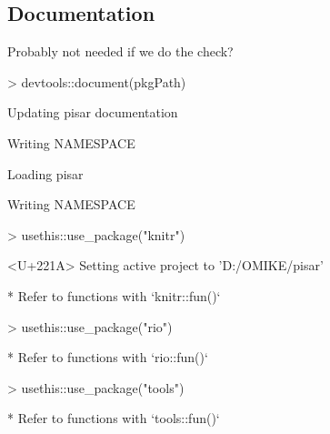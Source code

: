 \documentclass[a4paper,12pt]{article}\usepackage[]{graphicx}\usepackage[]{color}
\begin{document}
\clearpage
\subsection{Documentation}
Probably not needed if we do the check?
\begin{Schunk}
\begin{Sinput}
> devtools::document(pkgPath)
\end{Sinput}
\begin{Soutput}
Updating pisar documentation
\end{Soutput}
\begin{Soutput}
Writing NAMESPACE
\end{Soutput}
\begin{Soutput}
Loading pisar
\end{Soutput}
\begin{Soutput}
Writing NAMESPACE
\end{Soutput}
\begin{Sinput}
> usethis::use_package("knitr")
\end{Sinput}
\begin{Soutput}
<U+221A> Setting active project to 'D:/OMIKE/pisar'
\end{Soutput}
\begin{Soutput}
Warning in if (delta < 0) {: the condition has length > 1 and only the first element will be used
\end{Soutput}
\begin{Soutput}
Warning in if (delta > 0) {: the condition has length > 1 and only the first element will be used
\end{Soutput}
\begin{Soutput}
* Refer to functions with `knitr::fun()`
\end{Soutput}
\begin{Sinput}
> usethis::use_package("rio")
\end{Sinput}
\begin{Soutput}
* Refer to functions with `rio::fun()`
\end{Soutput}
\begin{Sinput}
> usethis::use_package("tools")
\end{Sinput}
\begin{Soutput}
* Refer to functions with `tools::fun()`
\end{Soutput}
\end{Schunk}
\clearpage
\end{document}
